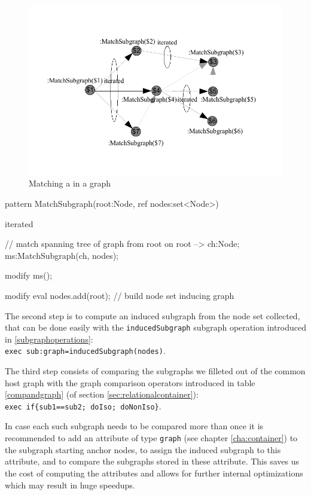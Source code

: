 \begin{figure}[htbp]
  \centering
  \includegraphics[width=\textwidth]{fig/SpanningTree}
  \caption{Matching a  in a graph}
  \label{figspanningtree}
\end{figure}

  \begin{example}\label{graphcompex}
    \begin{grgen}
pattern MatchSubgraph(root:Node, ref nodes:set<Node>)
{
  iterated { // match spanning tree of graph from root on
    root --> ch:Node;
    ms:MatchSubgraph(ch, nodes);

    modify {
      ms();
    }
  }

  modify {
    eval { nodes.add(root); } // build node set inducing graph
  }
}
    \end{grgen}
  \end{example}

The second step is to compute an induced subgraph from the node set collected, that can be done easily with the \texttt{inducedSubgraph} subgraph operation introduced in \ref{subgraphoperations}:\\ \verb#exec sub:graph=inducedSubgraph(nodes)#.

The third step consists of comparing the subgraphs we filleted out of the common host graph with the graph comparison operators introduced in table \ref{compandgraph} (of section \ref{sec:relationalcontainer}):\\
\verb#exec if{sub1==sub2; doIso; doNonIso}#.

In case each such subgraph needs to be compared more than once it is recommended to add an attribute of type \texttt{graph} (see chapter \ref{cha:container}) to the subgraph starting anchor nodes, to assign the induced subgraph to this attribute, and to compare the subgraphs stored in these attribute.
This saves us the cost of computing the attributes and allows for further internal optimizations which 
may result in huge speedups.


